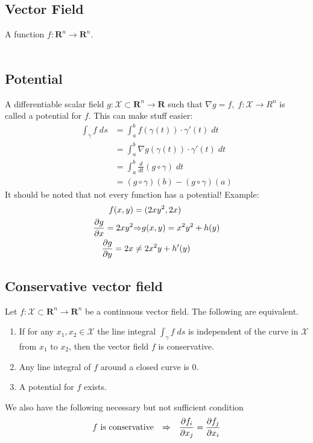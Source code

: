 \documentclass[8pt]{extarticle}
\newcommand{\R}{{\mathbb R}}
\newcommand{\X}{{\mathcal X}}
\newcommand{\ra}{{\rightarrow}}
\newcommand{\Ra}{{\Rightarrow}}
\def\R{\mathbf{R}}
\begin{document}
\begin{multicols*}{3}
  \subsection{Vector Field}
  A function $f: \R^n \ra \R^n$.\\ \\
  \subsection{Potential}
  A differentiable scalar field $g: \X \subset \R^n \ra \R$
  such that $\nabla g = f, \; f: \X \ra R^n$ is called
  a potential for $f$. This can make stuff easier:
  \begin{align*}
    \int_\gamma f \; ds & = \int_a^b f(\gamma(t)) \cdot \gamma'(t) \; dt        \\
                        & = \int_a^b \nabla g(\gamma(t)) \cdot \gamma'(t) \; dt \\
                        & = \int_a^b \frac{d}{dt} (g \circ \gamma) \; dt        \\
                        & = (g \circ \gamma)(b) - (g \circ \gamma)(a)
  \end{align*}
  It should be noted that not every function has a potential! Example:
  \begin{align*}
    f(x, y)            & = (2xy^2, 2x)               \\
    \pdv{g}{x} = 2xy^2 & \Ra g(x, y) = x^2y^2 + h(y) \\
    \pdv{g}{y} = 2x    & \neq 2x^2y + h'(y)
  \end{align*}
  \subsection{Conservative vector field}
  Let $f: \X \subset \R^n \ra \R^n$ be a continuous vector
  field. The following are equivalent.
  \begin{enumerate}[label=(\arabic*)]
    \item If for any $x_1, x_2 \in \X$ the line integral
          $\int_\gamma f \; ds$ is independent of the curve in $\X$
          from $x_1$ to $x_2$, then the vector field $f$ is conservative.
    \item Any line integral of $f$ around a closed curve is $0$.
    \item A potential for $f$ exists.
  \end{enumerate}
  We also have the following necessary but not sufficient
  condition
  \begin{align*}
    f \text{ is conservative} \quad \Ra \quad \pdv{f_i}{x_j} = \pdv{f_j}{x_i}
  \end{align*}

\end{multicols*}
\end{document}
